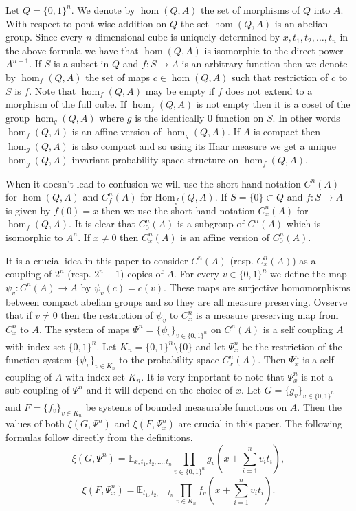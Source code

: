 \documentclass [11pt] {article}
\newcommand{\Hom}{\mathrm{Hom}}
\begin{document}
Let $Q=\{0,1\}^n$. We denote by $\hom(Q,A)$ the set of morphisms of $Q$ into $A$. With respect to pont wise addition on $Q$ the set $\hom(Q,A)$ is an abelian group. Since every $n$-dimensional cube is uniquely determined by $x,t_1,t_2,\dots,t_n$ in the above formula we have that $\hom(Q,A)$ is isomorphic to the direct power $A^{n+1}$.  
If $S$ is a subset in $Q$ and $f:S\rightarrow A$ is an arbitrary function then we denote by $\hom_f(Q,A)$ the set of maps $c\in\hom(Q,A)$ such that restriction of $c$ to $S$ is $f$.
Note that $\hom_f(Q,A)$ may be empty if $f$ does not extend to a morphism of the full cube. 
If $\hom_f(Q,A)$ is not empty then it is a coset of the group $\hom_g(Q,A)$ where $g$ is the identically $0$ function on $S$.
In other words $\hom_f(Q,A)$ is an affine version of $\hom_g(Q,A)$.
If $A$ is compact then $\hom_g(Q,A)$ is also compact and so using its Haar measure we get a unique $\hom_g(Q,A)$ invariant probability space structure on $\hom_f(Q,A)$.

When it doesn't lead to confusion we will use the short hand notation $C^n(A)$ for $\hom(Q,A)$ and $C^n_f(A)$ for $\Hom_f(Q,A)$. If $S=\{0\}\subset Q$ and $f:S\rightarrow A$ is given by $f(0)=x$ then we use the short hand notation $C_x^n(A)$ for $\hom_f(Q,A)$.   
It is clear that $C_0^n(A)$ is a subgroup of $C^n(A)$ which is isomorphic to $A^n$. If $x\neq 0$ then $C_x^n(A)$ is an affine version of $C_0^n(A)$. 

It is a crucial idea in this paper to consider $C^n(A)$ (resp. $C^n_x(A)$) as a coupling of $2^n$ (resp. $2^n-1$) copies of $A$. For every $v\in\{0,1\}^n$ we define the map $\psi_v:C^n(A)\rightarrow A$ by $\psi_v(c)=c(v)$. These maps are surjective homomorphisms between compact abelian groups and so they are all measure preserving. Ovserve that if $v\neq 0$ then the restriction of $\psi_v$ to $C^n_x$ is a measure preserving map from $C^n_x$ to $A$.
The system of maps $\Psi^n=\{\psi_v\}_{v\in\{0,1\}^n}$ on $C^n(A)$ is a self coupling $A$ with index set $\{0,1\}^n$. Let $K_n=\{0,1\}^n\setminus\{0\}$ and let $\Psi^n_x$ be the restriction of the function system $\{\psi_v\}_{v\in K_n}$ to the probability space $C^n_x(A)$. Then $\Psi^n_x$ is a self coupling of $A$ with index set $K_n$.
It is very important to note that $\Psi^n_x$ is not a sub-coupling of $\Psi^n$ and it will depend on the choice of $x$.
Let $G=\{g_v\}_{v\in\{0,1\}^n}$ and $F=\{f_v\}_{v\in K_n}$ be systems of bounded measurable functions on $A$. Then the values of both $\xi(G,\Psi^n)$ and $\xi(F,\Psi^n_x)$ are crucial in this paper. 
The following formulas follow directly from the definitions.
\begin{equation}\label{ginner} \xi(G,\Psi^n)=\mathbb{E}_{x,t_1,t_2,\dots,t_n}\prod_{v\in\{0,1\}^n}g_v(x+\sum_{i=1}^n v_it_i),
\end{equation}
\begin{equation}\label{corner}
\xi(F,\Psi_x^n)=\mathbb{E}_{t_1,t_2,\dots,t_n}\prod_{v\in K_n}f_v(x+\sum_{i=1}^n v_it_i).
\end{equation} 
\end{document}
